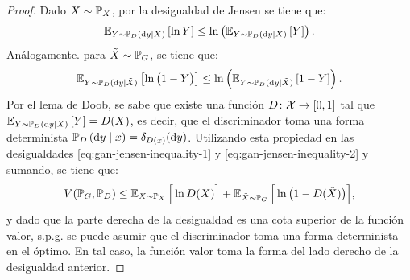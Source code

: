 {{\begin{proof}
    Dado $X \sim \Prob_X$, por la desigualdad de Jensen se tiene que:
    \begin{equation}\label{eq:gan-jensen-inequality-1}
        \Exp_{Y \sim \Prob_D \left( \dd y \mid X \right)} \left[ \ln Y \right]
        \leq \ln \left( \Exp_{Y \sim \Prob_D \left( \dd y \mid X \right)} \left[ Y \right] \right).
    \end{equation}
    Análogamente. para $\tilde X \sim \Prob_G$, se tiene que:
    \begin{equation}\label{eq:gan-jensen-inequality-2}
        \Exp_{Y \sim \Prob_D ( \dd y \mid \tilde X )} \left[ \ln \qty\big(1 - Y) \right]
        \leq \ln \left( \Exp_{Y \sim \Prob_D ( \dd y \mid \tilde X )} \left[ 1 - Y \right] \right).
    \end{equation}
    Por el lema de Doob, se sabe que existe una función $D \colon \mathcal{X} \to [0, 1]$ tal que $\Exp_{Y \sim \Prob_D \left( \dd y \mid X \right)} \left[ Y \right]
        = D(X)$,
    es decir, que el discriminador toma una forma determinista $\Prob_D \left( \dd y \mid x \right) = \delta_{D(x)}(\dd y)$. Utilizando esta propiedad en las desigualdades \eqref{eq:gan-jensen-inequality-1} y \eqref{eq:gan-jensen-inequality-2} y sumando, se tiene que:
    \begin{equation}
        V(\Prob_G, \Prob_D) \leq \Exp_{X \sim \Prob_X} \Big[ \ln D(X) \Big] + \Exp_{\tilde X \sim \Prob_G} \Big[ \ln \qty\big(1 - D(\tilde X)) \Big],
    \end{equation}
    y dado que la parte derecha de la desigualdad es una cota superior de la función valor, s.p.g. se puede asumir que el discriminador toma una forma determinista en el óptimo. En tal caso, la función valor toma la forma del lado derecho de la desigualdad anterior.


\end{proof}}}
